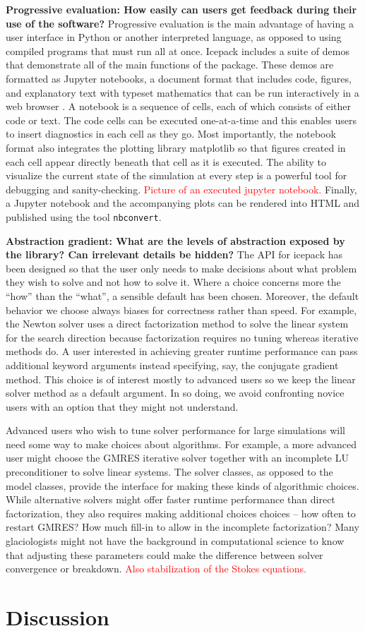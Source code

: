 \documentclass{article}
\theoremstyle{definition}
\theoremstyle{plain}
\begin{document}
\textbf{Progressive evaluation: How easily can users get feedback during their use of the software?}
Progressive evaluation is the main advantage of having a user interface in Python or another interpreted language, as opposed to using compiled programs that must run all at once.
Icepack includes a suite of demos that demonstrate all of the main functions of the package.
These demos are formatted as Jupyter notebooks, a document format that includes code, figures, and explanatory text with typeset mathematics that can be run interactively in a web browser \citep{kluyver2016jupyter}.
A notebook is a sequence of cells, each of which consists of either code or text.
The code cells can be executed one-at-a-time and this enables users to insert diagnostics in each cell as they go.
Most importantly, the notebook format also integrates the plotting library matplotlib so that figures created in each cell appear directly beneath that cell as it is executed.
The ability to visualize the current state of the simulation at every step is a powerful tool for debugging and sanity-checking.
\textcolor{red}{Picture of an executed jupyter notebook.}
Finally, a Jupyter notebook and the accompanying plots can be rendered into HTML and published using the tool \texttt{nbconvert}.

\textbf{Abstraction gradient: What are the levels of abstraction exposed by the library?
Can irrelevant details be hidden?}
The API for icepack has been designed so that the user only needs to make decisions about what problem they wish to solve and not how to solve it.
Where a choice concerns more the ``how'' than the ``what'', a sensible default has been chosen.
Moreover, the default behavior we choose always biases for correctness rather than speed.
For example, the Newton solver uses a direct factorization method to solve the linear system for the search direction because factorization requires no tuning whereas iterative methods do.
A user interested in achieving greater runtime performance can pass additional keyword arguments instead specifying, say, the conjugate gradient method.
This choice is of interest mostly to advanced users so we keep the linear solver method as a default argument.
In so doing, we avoid confronting novice users with an option that they might not understand.

Advanced users who wish to tune solver performance for large simulations will need some way to make choices about algorithms.
For example, a more advanced user might choose the GMRES iterative solver together with an incomplete LU preconditioner to solve linear systems.
The solver classes, as opposed to the model classes, provide the interface for making these kinds of algorithmic choices.
While alternative solvers might offer faster runtime performance than direct factorization, they also requires making additional choices choices -- how often to restart GMRES?
How much fill-in to allow in the incomplete factorization?
Many glaciologists might not have the background in computational science to know that adjusting these parameters could make the difference between solver convergence or breakdown.
\textcolor{red}{Also stabilization of the Stokes equations.}


\section{Discussion}



\end{document}
